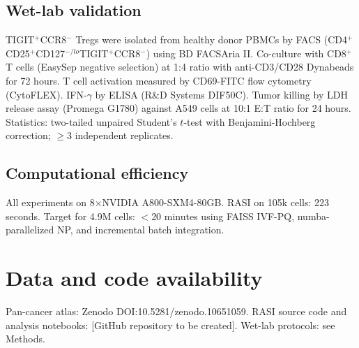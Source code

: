 \documentclass[10pt]{article}
\begin{document}
\subsection{Wet-lab validation}
TIGIT$^+$CCR8$^-$ Tregs were isolated from healthy donor PBMCs by FACS (CD4$^+$CD25$^+$CD127$^{-/lo}$TIGIT$^+$CCR8$^-$) using BD FACSAria II. Co-culture with CD8$^+$ T cells (EasySep negative selection) at 1:4 ratio with anti-CD3/CD28 Dynabeads for 72 hours. T cell activation measured by CD69-FITC flow cytometry (CytoFLEX). IFN-$\gamma$ by ELISA (R\&D Systems DIF50C). Tumor killing by LDH release assay (Promega G1780) against A549 cells at 10:1 E:T ratio for 24 hours. Statistics: two-tailed unpaired Student's $t$-test with Benjamini-Hochberg correction; $\geq$3 independent replicates.

\subsection{Computational efficiency}
All experiments on 8$\times$NVIDIA A800-SXM4-80GB. RASI on 105k cells: 223 seconds. Target for 4.9M cells: $<$20 minutes using FAISS IVF-PQ, numba-parallelized NP, and incremental batch integration.

\section{Data and code availability}
Pan-cancer atlas: Zenodo DOI:10.5281/zenodo.10651059. RASI source code and analysis notebooks: [GitHub repository to be created]. Wet-lab protocols: see Methods.



\end{document}
